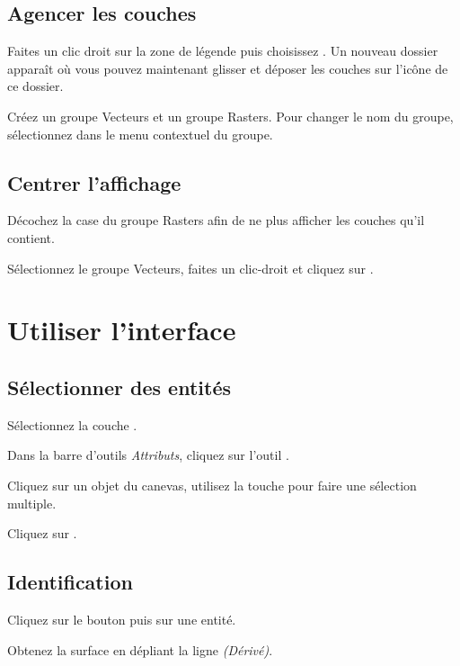 \subsection{Agencer les couches}

Faites un clic droit sur la zone de légende puis choisissez . Un nouveau dossier apparaît où vous pouvez maintenant glisser et déposer les couches sur l'icône de ce dossier. 

Créez un groupe Vecteurs et un groupe Rasters. Pour changer le nom du groupe, sélectionnez  dans le menu contextuel du groupe.

\subsection{Centrer l'affichage}

Décochez la case du groupe Rasters afin de ne plus afficher les couches qu'il contient.

Sélectionnez le groupe Vecteurs, faites un clic-droit et cliquez sur .

\section{Utiliser l'interface}\label{sec:ui_use} 

\subsection{Sélectionner des entités}

Sélectionnez la couche .

Dans la barre d'outils \textit{Attributs}, cliquez sur l'outil .

Cliquez sur un objet du canevas, utilisez la touche  pour faire une sélection multiple.

Cliquez sur .

\subsection{Identification}

Cliquez sur le bouton  puis sur une entité.

Obtenez la surface en dépliant la ligne \textit{(Dérivé)}.

